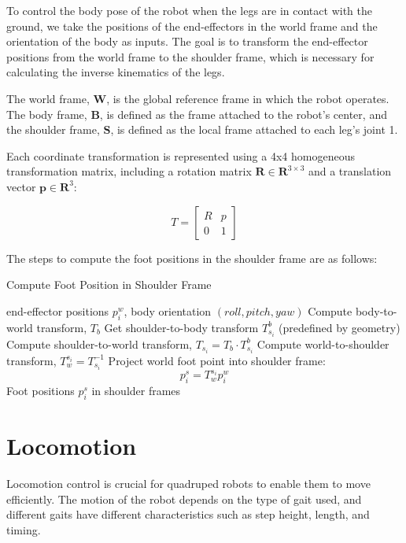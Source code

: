 \documentclass[a4paper,11pt]{article}
\begin{document}
To control the body pose of the robot when the legs are in contact with the ground, we take
the positions of the end-effectors in the world frame and the orientation of the body as inputs.
The goal is to transform the end-effector positions from the world frame to the shoulder frame, which is necessary for
calculating the inverse kinematics of the legs.

The world frame, $\boldsymbol{W}$, is the global reference frame in which the robot operates. 
The body frame, $\boldsymbol{B}$, is defined as the frame attached to the robot's center, and 
the shoulder frame, $\boldsymbol{S}$, is defined as the local frame attached to each leg's joint 1.

Each coordinate transformation is represented using a 4x4 homogeneous transformation matrix, including a rotation matrix $\mathbf{R} \in \mathbf{R}^{3 \times 3}$
and a translation vector $\mathbf{p} \in \mathbf{R}^{3}$:

$$
T = \begin{bmatrix}
R & p \\
0 & 1
\end{bmatrix}
$$

The steps to compute the foot positions in the shoulder frame are as follows:

\begin{algorithm}[H]
\caption{Compute Foot Position in Shoulder Frame}
\begin{algorithmic}[1]
\Require end-effector positions $p^w_i$, body orientation $(roll, pitch, yaw)$
\State Compute body-to-world transform, $T_b$
    \State Get shoulder-to-body transform $T_{s_i}^b$ (predefined by geometry)
    \State Compute shoulder-to-world transform, $T_{s_i} = T_b \cdot T_{s_i}^b$
    \State Compute world-to-shoulder transform, $T_w^{s_i} = T_{s_i}^{-1}$
    \State Project world foot point into shoulder frame:
    $$
    p_i^s = T_w^{s_i} p_i^w
    $$
\EndFor
\State \Return Foot positions $p_i^s$ in shoulder frames
\end{algorithmic}
\end{algorithm}

\section{Locomotion}

Locomotion control is crucial for quadruped robots to enable them to move efficiently. The motion of the robot depends on the type of gait used, and different gaits have different characteristics such as step height, length, and timing.
\end{document}
